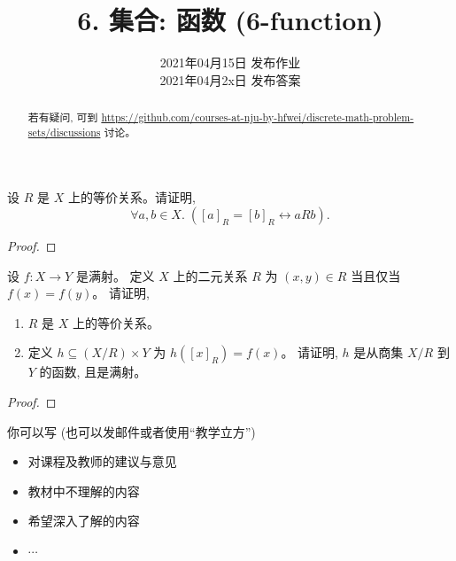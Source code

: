 \documentclass[a4paper, justified]{tufte-handout}
\title{6. 集合: 函数 (6-function)}
\date{2021年04月15日 发布作业 \\ 2021年04月2x日 发布答案}
\begin{document}
\maketitle
\noplagiarism %
\begin{abstract}
  若有疑问, 可到 \url{https://github.com/courses-at-nju-by-hfwei/discrete-math-problem-sets/discussions}
  讨论。
\end{abstract}
\beginrequired

\begin{problem}
  设 $R$ 是 $X$ 上的等价关系。请证明,
  \[
    \forall a, b \in X.\; ([a]_{R} = [b]_{R} \leftrightarrow a R b).
  \]
\end{problem}

\begin{proof}
\end{proof}

\begin{problem}[函数与等价关系 \score{7 = 3 + 4} $\star\star\star$]
  设 $f: X \to Y$ 是满射。
  定义 $X$ 上的二元关系 $R$ 为 $(x, y) \in R$ 当且仅当 $f(x) = f(y)$。
  请证明,
  \begin{enumerate}[(1)]
    \item $R$ 是 $X$ 上的等价关系。
    \item 定义 $h \subseteq (X/R) \times Y$ 为 $h([x]_{R}) = f(x)$。
      请证明, $h$ 是从商集 $X/R$ 到 $Y$ 的函数, 且是满射。
  \end{enumerate}
\end{problem}

\begin{proof}
\end{proof}

\begincorrection

\beginfb

你可以写 (也可以发邮件或者使用``教学立方'')
\begin{itemize}
  \item 对课程及教师的建议与意见
  \item 教材中不理解的内容
  \item 希望深入了解的内容
  \item $\cdots$
\end{itemize}
\end{document}
